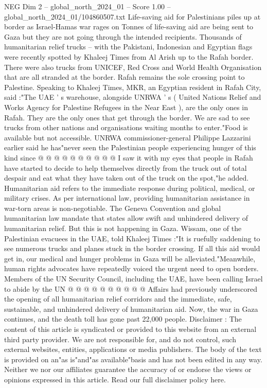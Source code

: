 \begin{textsample}{NEG Dim 2 – global\_north\_2024\_01 – Score 1.00 – global\_north\_2024\_01/104860507.txt}  \label{ex:f2_neg_341}
Life-saving aid for Palestinians piles up at border as Israel-Hamas war rages on Tonnes of life-saving aid are being sent to Gaza but they are not going through the intended recipients.
Thousands of humanitarian relief trucks -- with the Pakistani, Indonesian and Egyptian flags were recently spotted by Khaleej Times from Al Arish up to the Rafah border.
There were also trucks from UNICEF, Red Cross and World Health Organisation that are all stranded at the border.
Rafah remains the sole crossing point to Palestine.
Speaking to Khaleej Times, MKR, an Egyptian resident in Rafah City, said :"The UAE ' s warehouse, alongside UNRWA ' s ( United Nations Relief and Works Agency for Palestine Refugees in the Near East ), are the only ones in Rafah.
They are the only ones that get through the border.
We are sad to see trucks from other nations and organisations waiting months to enter."Food is available but not accessible.
UNRWA commissioner-general Philippe Lazzarini earlier said he has"never seen the Palestinian people experiencing hunger of this kind since @ @ @ @ @ @ @ @ @ @ I saw it with my eyes that people in Rafah have started to decide to help themselves directly from the truck out of total despair and eat what they have taken out of the truck on the spot,"he added.
Humanitarian aid refers to the immediate response during political, medical, or military crises.
As per international law, providing humanitarian assistance in war-torn areas is non-negotiable.
The Geneva Convention and global humanitarian law mandate that states allow swift and unhindered delivery of humanitarian relief.
But this is not happening in Gaza.
Wissam, one of the Palestinian evacuees in the UAE, told Khaleej Times :"It is ruefully saddening to see numerous trucks and planes stuck in the border crossing.
If all this aid would get in, our medical and hunger problems in Gaza will be alleviated."Meanwhile, human rights advocates have repeatedly voiced the urgent need to open borders.
Members of the UN Security Council, including the UAE, have been calling Israel to abide by the UN @ @ @ @ @ @ @ @ @ @ Affairs had previously underscored the opening of all humanitarian relief corridors and the immediate, safe, sustainable, and unhindered delivery of humanitarian aid.
Now, the war in Gaza continues, and the death toll has gone past 22,000 people.
Disclaimer : The content of this article is syndicated or provided to this website from an external third party provider.
We are not responsible for, and do not control, such external websites, entities, applications or media publishers.
The body of the text is provided on an"as is"and"as available"basis and has not been edited in any way.
Neither we nor our affiliates guarantee the accuracy of or endorse the views or opinions expressed in this article.
Read our full disclaimer policy here.

\end{textsample}

